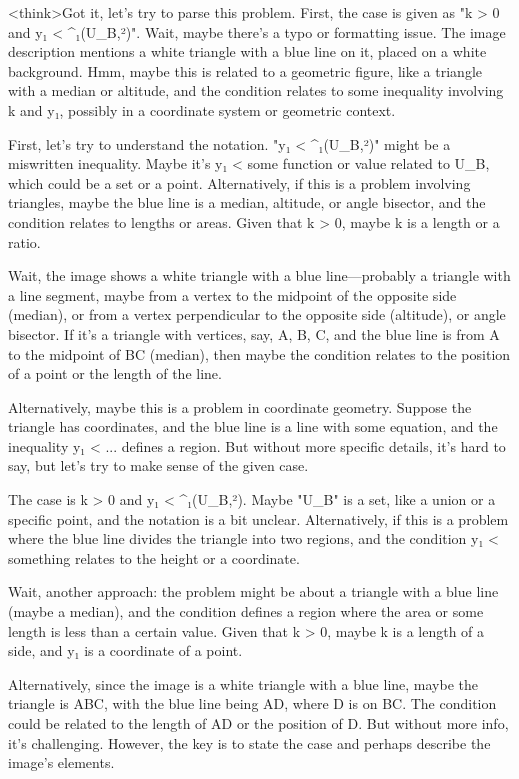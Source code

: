 <think>Got it, let's try to parse this problem. First, the case is given as "k > 0 and y₁ < ^₁(U_B,²)". Wait, maybe there's a typo or formatting issue. The image description mentions a white triangle with a blue line on it, placed on a white background. Hmm, maybe this is related to a geometric figure, like a triangle with a median or altitude, and the condition relates to some inequality involving k and y₁, possibly in a coordinate system or geometric context.

First, let's try to understand the notation. "y₁ < ^₁(U_B,²)" might be a miswritten inequality. Maybe it's y₁ < some function or value related to U_B, which could be a set or a point. Alternatively, if this is a problem involving triangles, maybe the blue line is a median, altitude, or angle bisector, and the condition relates to lengths or areas. Given that k > 0, maybe k is a length or a ratio.

Wait, the image shows a white triangle with a blue line—probably a triangle with a line segment, maybe from a vertex to the midpoint of the opposite side (median), or from a vertex perpendicular to the opposite side (altitude), or angle bisector. If it's a triangle with vertices, say, A, B, C, and the blue line is from A to the midpoint of BC (median), then maybe the condition relates to the position of a point or the length of the line.

Alternatively, maybe this is a problem in coordinate geometry. Suppose the triangle has coordinates, and the blue line is a line with some equation, and the inequality y₁ < ... defines a region. But without more specific details, it's hard to say, but let's try to make sense of the given case.

The case is k > 0 and y₁ < ^₁(U_B,²). Maybe "U_B" is a set, like a union or a specific point, and the notation is a bit unclear. Alternatively, if this is a problem where the blue line divides the triangle into two regions, and the condition y₁ < something relates to the height or a coordinate.

Wait, another approach: the problem might be about a triangle with a blue line (maybe a median), and the condition defines a region where the area or some length is less than a certain value. Given that k > 0, maybe k is a length of a side, and y₁ is a coordinate of a point.

Alternatively, since the image is a white triangle with a blue line, maybe the triangle is ABC, with the blue line being AD, where D is on BC. The condition could be related to the length of AD or the position of D. But without more info, it's challenging. However, the key is to state the case and perhaps describe the image's elements.


